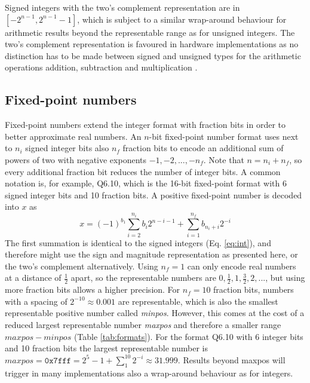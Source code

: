 Signed integers with the two's complement representation are in $[-2^{n-1},2^{n-1}-1]$, which is subject to a similar wrap-around behaviour 
for arithmetic results beyond the representable range as for unsigned integers. The two's complement representation
is favoured in hardware implementations as no distinction has to be made between signed and unsigned types for the
arithmetic operations addition, subtraction and multiplication \citep{Choo2003}.

\subsection{Fixed-point numbers}
\label{sec:fixpoints}

Fixed-point numbers extend the integer format with fraction bits in order to better approximate real numbers. 
An $n$-bit fixed-point number format uses next to $n_i$ signed integer bits also $n_f$ fraction bits to encode 
an additional sum of powers of two with negative exponents $-1,-2,...,-n_f$. Note that $n = n_i + n_f$, so
every additional fraction bit reduces the number of integer bits. A common notation is, for example,
Q6.10, which is the 16-bit fixed-point format with 6 signed integer bits and 10 fraction bits.
A positive fixed-point number is decoded into $x$ as
\begin{equation}
x = (-1)^{b_1}\sum_{i=2}^{n_i} b_i 2^{n-i-1}  + \sum_{i=1}^{n_f} b_{n_i+i} 2^{-i}
\label{eq:fixpoints}
\end{equation}
The first summation is identical to the signed integers (Eq. \ref{eq:int}), and therefore might use the sign and magnitude
representation as presented here, or the two's complement alternatively. Using $n_f = 1$ can only encode real numbers
at a distance of $\tfrac{1}{2}$ apart, so the representable numbers are $0,\tfrac{1}{2},1,\tfrac{3}{2},2,...$, but using more fraction
bits allows a higher precision. For $n_f=10$ fraction bits, numbers with a spacing of $2^{-10} \approx 0.001$ are representable,
which is also the smallest representable positive number called \emph{minpos}. However, this comes at the cost of a reduced
largest representable number \emph{maxpos} and therefore a smaller range $maxpos-minpos$ (Table \ref{tab:formats}).
For the format Q6.10 with 6 integer bits and 10 fraction bits the largest representable number is $maxpos = \mathtt{0x7fff} = 2^5-1 + \sum_1^{10} 2^{-i}
\approx 31.999$. Results beyond maxpos will trigger in many implementations also a wrap-around behaviour as for integers.

